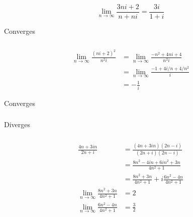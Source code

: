 \documentclass{article}
\begin{document}
\[\lim_{n \rightarrow \infty} \frac{3 n i + 2}{n + n i} = \frac{3 i}{1 + i}\]

Converges

\setcounter{subsubsection}{6}
\subsubsection{}

\begin{align*}
  \lim_{n \rightarrow \infty} \frac{(n i + 2)^2}{n^2 i} & = \lim_{n \rightarrow \infty} \frac{-n^2 + 4 n i + 4}{n^2 i}   \\
                                                        & = \lim_{n \rightarrow \infty} \frac{-1 + 4 i / n + 4 / n^2}{i} \\
                                                        & = -\frac{1}{i}
\end{align*}

Converges

\setcounter{subsubsection}{8}
\subsubsection{}

Diverges

\setcounter{subsubsection}{10}
\subsubsection{}

\begin{align*}
  \frac{4 n + 3 i n}{2 n + i}                               & = \frac{(4 n + 3 i n) (2 n - i)}{(2 n + i) (2 n - i)}             \\
                                                            & = \frac{8n^2 - 4 i n + 6 i n^2 + 3 n}{4 n^2 + 1}                  \\
                                                            & = \frac{8 n^2 + 3 n}{4 n^2 + 1} + i \frac{6 n^2 - 4 n}{4 n^2 + 1} \\
  \lim_{n \rightarrow \infty} \frac{8 n^2 + 3 n}{4 n^2 + 1} & = 2                                                               \\
  \lim_{n \rightarrow \infty} \frac{6 n^2 - 4 n}{4 n^2 + 1} & = \frac{3}{2}
\end{align*}

\setcounter{subsubsection}{12}
\subsubsection{}
\end{document}
